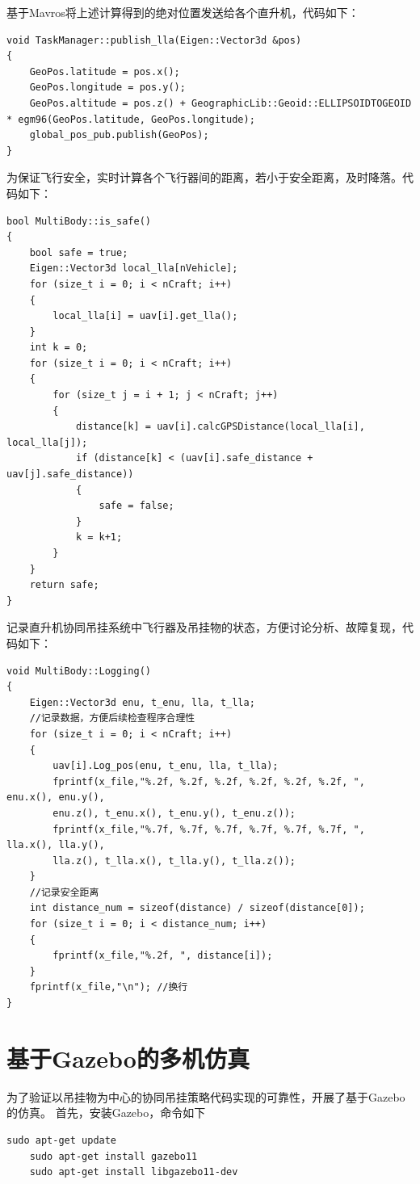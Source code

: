 基于Mavros将上述计算得到的绝对位置发送给各个直升机，代码如下：
\begin{lstlisting}[style = lstStyleBase]
void TaskManager::publish_lla(Eigen::Vector3d &pos)
{
    GeoPos.latitude = pos.x();
    GeoPos.longitude = pos.y();
    GeoPos.altitude = pos.z() + GeographicLib::Geoid::ELLIPSOIDTOGEOID * egm96(GeoPos.latitude, GeoPos.longitude);
    global_pos_pub.publish(GeoPos);
}
\end{lstlisting}

为保证飞行安全，实时计算各个飞行器间的距离，若小于安全距离，及时降落。代码如下：
\begin{lstlisting}[style = lstStyleBase]
bool MultiBody::is_safe()
{
    bool safe = true;
    Eigen::Vector3d local_lla[nVehicle];
    for (size_t i = 0; i < nCraft; i++)
    {
        local_lla[i] = uav[i].get_lla();
    }
    int k = 0;
    for (size_t i = 0; i < nCraft; i++)
    {
        for (size_t j = i + 1; j < nCraft; j++)
        {
            distance[k] = uav[i].calcGPSDistance(local_lla[i], local_lla[j]);
            if (distance[k] < (uav[i].safe_distance + uav[j].safe_distance))
            {
                safe = false;
            }
            k = k+1;
        }
    }
    return safe;
}
\end{lstlisting}

记录直升机协同吊挂系统中飞行器及吊挂物的状态，方便讨论分析、故障复现，代码如下：
\begin{lstlisting}[style = lstStyleBase]
void MultiBody::Logging()
{
    Eigen::Vector3d enu, t_enu, lla, t_lla;
    //记录数据，方便后续检查程序合理性
    for (size_t i = 0; i < nCraft; i++)
    {
        uav[i].Log_pos(enu, t_enu, lla, t_lla);
        fprintf(x_file,"%.2f, %.2f, %.2f, %.2f, %.2f, %.2f, ", enu.x(), enu.y(), 
        enu.z(), t_enu.x(), t_enu.y(), t_enu.z());
        fprintf(x_file,"%.7f, %.7f, %.7f, %.7f, %.7f, %.7f, ", lla.x(), lla.y(), 
        lla.z(), t_lla.x(), t_lla.y(), t_lla.z());
    }
    //记录安全距离
    int distance_num = sizeof(distance) / sizeof(distance[0]);
    for (size_t i = 0; i < distance_num; i++)
    {
        fprintf(x_file,"%.2f, ", distance[i]);
    }
    fprintf(x_file,"\n"); //换行
}
\end{lstlisting}

\section{基于Gazebo的多机仿真}

为了验证以吊挂物为中心的协同吊挂策略代码实现的可靠性，开展了基于Gazebo的仿真。
首先，安装Gazebo，命令如下
\begin{lstlisting}[style = lstStyleBase]
    sudo apt-get update
    sudo apt-get install gazebo11
    sudo apt-get install libgazebo11-dev
\end{lstlisting}

